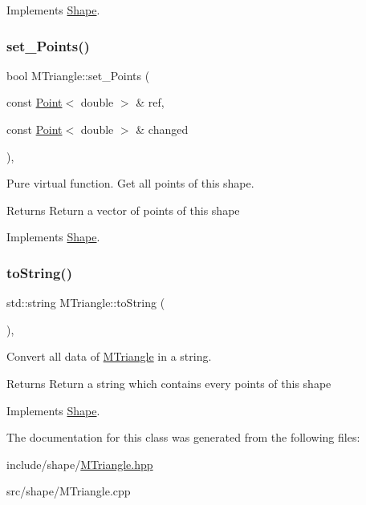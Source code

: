 Implements \hyperlink{classShape_a2dea8616fd40f2d69fd208715921982a}{Shape}.

\mbox{\label{classMTriangle_aec40d088d077bfb14f94895be871dfdf}} 
\subsubsection{\texorpdfstring{set\+\_\+\+Points()}{set\_Points()}}
{\footnotesize\ttfamily bool M\+Triangle\+::set\+\_\+\+Points (\begin{DoxyParamCaption}\item[{const \hyperlink{classPoint}{Point}$<$ double $>$ \&}]{ref,  }\item[{const \hyperlink{classPoint}{Point}$<$ double $>$ \&}]{changed }\end{DoxyParamCaption})\hspace{0.3cm}{\ttfamily [override]}, {\ttfamily [virtual]}}



Pure virtual function. Get all points of this shape. 

\begin{DoxyReturn}{Returns}
Return a vector of points of this shape 
\end{DoxyReturn}


Implements \hyperlink{classShape_a6eb0d80cccc44cb72b06c61d9780bc6b}{Shape}.

\mbox{\label{classMTriangle_a7d1fd825592dffa6ac05b3398a8c105a}} 
\subsubsection{\texorpdfstring{to\+String()}{toString()}}
{\footnotesize\ttfamily std\+::string M\+Triangle\+::to\+String (\begin{DoxyParamCaption}{ }\end{DoxyParamCaption})\hspace{0.3cm}{\ttfamily [override]}, {\ttfamily [virtual]}}



Convert all data of \hyperlink{classMTriangle}{M\+Triangle} in a string. 

\begin{DoxyReturn}{Returns}
Return a string which contains every points of this shape 
\end{DoxyReturn}


Implements \hyperlink{classShape_a98fa87c6dc4c7045fd6897a8f3bc186c}{Shape}.



The documentation for this class was generated from the following files\+:\begin{DoxyCompactItemize}
\item 
include/shape/\hyperlink{MTriangle_8hpp}{M\+Triangle.\+hpp}\item 
src/shape/M\+Triangle.\+cpp\end{DoxyCompactItemize}
